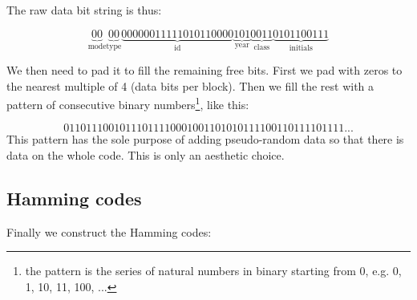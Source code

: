 The raw data bit string is thus:

\[
  \underbrace{00}_{\text{mode}} \underbrace{00}_{\text{type}} \underbrace{00000011111010110000}_{\text{id}} \underbrace{101}_{\text{year}} \underbrace{0011}_{\text{class}} \underbrace{0101100111}_{\text{initials}}
\]

We then need to pad it to fill the remaining free bits. First we pad with zeros to the nearest multiple of 4 (data bits per block).
Then we fill the rest with a pattern of consecutive binary numbers\footnote{the pattern is the series of natural numbers in binary starting from 0, e.g. 0, 1, 10, 11, 100, ...}, like this:

\[
  01101110010111011110001001101010111100110111101111...
\]
This pattern has the sole purpose of adding pseudo-random data so that there is data on the whole code. This is only an aesthetic choice.

\pagebreak

\subsection{Hamming codes}
\label{ssec:lycacode_ex_hamming}

Finally we construct the Hamming codes:

